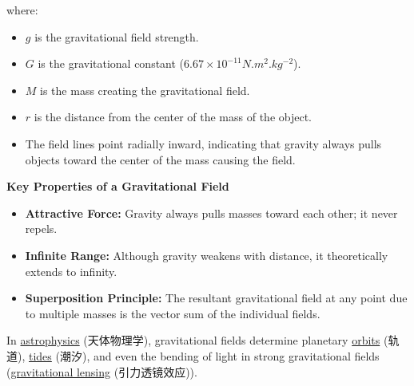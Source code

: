 {\begin{itemize}
\begin{itemize}
        where:
        \begin{itemize}
            \item $g$ is the gravitational field strength.
            \item $G$ is the gravitational constant ($6.67 \times 10^{-11} \unit{N.m^2.kg^{-2}}$).
            \item $M$ is the mass creating the gravitational field.
            \item $r$ is the distance from the center of the mass of the object.
            \item The field lines point radially inward, indicating that gravity always pulls objects toward the center of the
            mass causing the field.
        \end{itemize}
    \end{itemize}
\end{itemize} \par
\textbf{Key Properties of a Gravitational Field}
\begin{itemize}
    \item \textbf{Attractive Force:} Gravity always pulls masses toward each other; it never repels.
    \item \textbf{Infinite Range:} Although gravity weakens with distance, it theoretically extends to infinity.
    \item \textbf{Superposition Principle:} The resultant gravitational field at any point due to multiple masses is the vector
    sum of the individual fields.
\end{itemize} \par
In \underline{astrophysics} (天体物理学), gravitational fields determine planetary \underline{orbits} (轨道), \underline{tides}
(潮汐), and even the bending of light in strong gravitational fields (\underline{gravitational lensing} (引力透镜效应)).}

